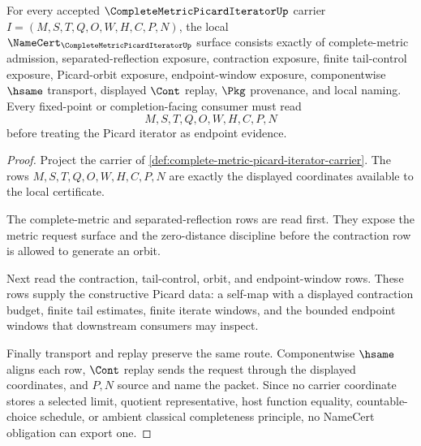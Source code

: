 \begin{theorem}
\label{thm:complete-metric-picard-iterator-namecert-obligations}
For every accepted $\CompleteMetricPicardIteratorUp$ carrier $I=(M,S,T,Q,O,W,H,C,P,N)$, the local $\NameCert_{\CompleteMetricPicardIteratorUp}$ surface consists exactly of complete-metric admission, separated-reflection exposure, contraction exposure, finite tail-control exposure, Picard-orbit exposure, endpoint-window exposure, componentwise $\hsame$ transport, displayed $\Cont$ replay, $\Pkg$ provenance, and local naming. Every fixed-point or completion-facing consumer must read
$$
M,S,T,Q,O,W,H,C,P,N
$$
before treating the Picard iterator as endpoint evidence.
\end{theorem}
\begin{proof}
Project the carrier of \autoref{def:complete-metric-picard-iterator-carrier}. The rows $M,S,T,Q,O,W,H,C,P,N$ are exactly the displayed coordinates available to the local certificate.

The complete-metric and separated-reflection rows are read first. They expose the metric request surface and the zero-distance discipline before the contraction row is allowed to generate an orbit.

Next read the contraction, tail-control, orbit, and endpoint-window rows. These rows supply the constructive Picard data: a self-map with a displayed contraction budget, finite tail estimates, finite iterate windows, and the bounded endpoint windows that downstream consumers may inspect.

Finally transport and replay preserve the same route. Componentwise $\hsame$ aligns each row, $\Cont$ replay sends the request through the displayed coordinates, and $P,N$ source and name the packet. Since no carrier coordinate stores a selected limit, quotient representative, host function equality, countable-choice schedule, or ambient classical completeness principle, no NameCert obligation can export one.
\end{proof}


